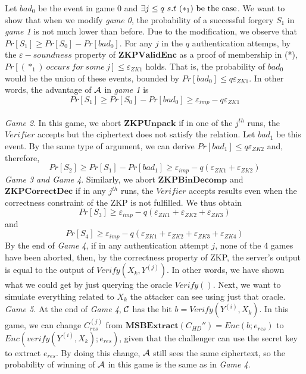 Let $bad_0$ be the event in game 0 and $\exists j \leq q\ s.t\ (*_1)\ \textnormal{be the case}$. We want to show that when we
modify \textit{game 0}, the probability of a successful forgery $S_1$ in \textit{game 1} is not much lower than before. Due to the modification, we observe that $ Pr[S_1] \geq Pr[S_0] - Pr[bad_0] $. For any $j$ in the $q$
authentication attemps, by the $\varepsilon-soundness$ property of $\mathbf{ZKPValidEnc}$ as a proof of membership in
(*), $Pr[(*_1)\ occurs\ for\ some \ j] \leq \varepsilon_{ZK1}$ holds. That is, the probability of $bad_0$ would be the union
of these events, bounded by $Pr[bad_0] \leq q\varepsilon_{ZK1}$. In other words, the advantage of $\mathcal{A}$ in
\textit{game 1} is
\[
  Pr[S_1] \geq Pr[S_0] - Pr[bad_0] \geq \varepsilon_{imp} - q\varepsilon_{ZK1}
\]
\\
\textit{Game 2}. In this game, we abort $\mathbf{ZKPUnpack}$ if in one of the $j^{th}$ runs, the $Verifier$ accepts but
the ciphertext does not satisfy the relation. Let $bad_1$ be this event. By the same type of argument, we can derive
$Pr[bad_1] \leq q\varepsilon_{ZK2}$ and, therefore,
$$Pr[S_2] \geq Pr[S_1]
- Pr[bad_1] \geq \varepsilon_{imp} - q(\varepsilon_{ZK1}+\varepsilon_{ZK2})
$$
\textit{Game 3 and Game 4}. Similarly, we abort $\mathbf{ZKPBinDecomp}$ and $\mathbf{ZKPCorrectDec}$ if in any $j^{th}$
runs, the $Verifier$ accepts results even when the correctness constraint of the ZKP is not fulfilled. We thus obtain
$$Pr[S_3] \geq  \varepsilon_{imp} - q(\varepsilon_{ZK1}+\varepsilon_{ZK2}
+\varepsilon_{ZK3})
$$ and
$$Pr[S_4] \geq  \varepsilon_{imp} - q(\varepsilon_{ZK1}+\varepsilon_{ZK2} +
\varepsilon_{ZK3} + \varepsilon_{ZK4})
$$
By the end of \textit{Game 4}, if in any authentication attempt $j$, none of the 4 games have been aborted, then, by
the correctness property of ZKP, the server's output is equal to the output of $Verify(X_k, Y^{(j)})$. In other words, we
have shown what we could get by just querying the oracle $Verify()$. Next, we want to simulate everything related to
$X_k$ the attacker can see using
just that oracle.\\
\textit{Game 5.} At the end of \textit{Game 4}, $\mathcal{C}$ has the bit $b = Verify(Y^{(i)},X_k)$. In this game, we
can change $C_{res}^{(j)}$ from $\mathbf{MSBExtract}(C_{HD}'') = Enc(b;e_{res})$ to $Enc(verify(Y^{(i)},X_k);e_{res})$,
given that the challenger can use the secret key to extract $e_{res}$. By doing this change, $\mathcal{A}$ still sees the
same ciphertext, so the probability of winning of $\mathcal{A}$ in this game
is the same as in \textit{Game 4}.\\
